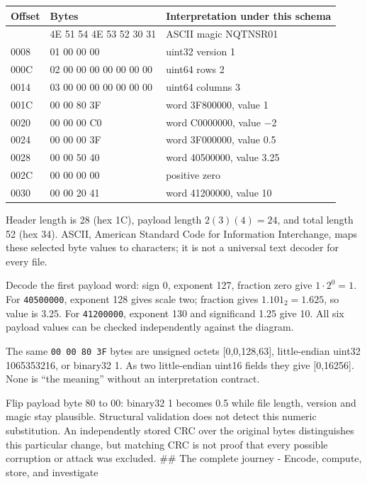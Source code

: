 {\def\LTcaptype{none} %
\begin{longtable}[]{@{}lll@{}}
\toprule\noalign{}
Offset & Bytes & Interpretation under this schema \\
\midrule\noalign{}
\endhead
\bottomrule\noalign{}
\endlastfoot
0000 & 4E 51 54 4E 53 52 30 31 & ASCII magic NQTNSR01 \\
0008 & 01 00 00 00 & uint32 version 1 \\
000C & 02 00 00 00 00 00 00 00 & uint64 rows 2 \\
0014 & 03 00 00 00 00 00 00 00 & uint64 columns 3 \\
001C & 00 00 80 3F & word 3F800000, value 1 \\
0020 & 00 00 00 C0 & word C0000000, value −2 \\
0024 & 00 00 00 3F & word 3F000000, value 0.5 \\
0028 & 00 00 50 40 & word 40500000, value 3.25 \\
002C & 00 00 00 00 & positive zero \\
0030 & 00 00 20 41 & word 41200000, value 10 \\
\end{longtable}
}

Header length is 28 (hex 1C), payload length \(2(3)(4)=24\), and total length 52 (hex 34). ASCII, American Standard Code for Information Interchange, maps these selected byte values to characters; it is not a universal text decoder for every file.

Decode the first payload word: sign 0, exponent 127, fraction zero give \(1\cdot2^0=1\). For \texttt{40500000}, exponent 128 gives scale two; fraction gives \(1.101_2=1.625\), so value is 3.25. For \texttt{41200000}, exponent 130 and significand 1.25 give 10. All six payload values can be checked independently against the diagram.

The same \texttt{00\ 00\ 80\ 3F} bytes are unsigned octets {[}0,0,128,63{]}, little-endian uint32 1065353216, or binary32 1. As two little-endian uint16 fields they give {[}0,16256{]}. None is ``the meaning'' without an interpretation contract.

Flip payload byte 80 to 00: binary32 1 becomes 0.5 while file length, version and magic stay plausible. Structural validation does not detect this numeric substitution. An independently stored CRC over the original bytes distinguishes this particular change, but matching CRC is not proof that every possible corruption or attack was excluded. \#\# The complete journey - Encode, compute, store, and investigate

